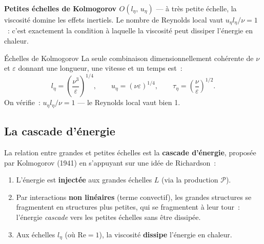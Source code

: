 \documentclass[11pt,a4paper]{report}
\begin{document}
\medskip
\noindent\textbf{Petites \'echelles de Kolmogorov $O(l_\eta,\,u_\eta)$} --- \`a tr\`es petite
\'echelle, la viscosit\'e domine les effets inertiels. Le nombre de Reynolds local vaut
$u_\eta l_\eta/\nu = 1$~: c'est exactement la condition \`a laquelle la viscosit\'e peut
dissiper l'\'energie en chaleur.

\begin{defbox}{\'Echelles de Kolmogorov}
La seule combinaison dimensionnellement coh\'erente de $\nu$ et $\varepsilon$ donnant une
longueur, une vitesse et un temps est~:
\[
  l_\eta = \left(\frac{\nu^3}{\varepsilon}\right)^{1/4}, \qquad
  u_\eta = (\nu\varepsilon)^{1/4}, \qquad
  \tau_\eta = \left(\frac{\nu}{\varepsilon}\right)^{1/2}.
\]
On v\'erifie~: $u_\eta l_\eta/\nu = 1$ --- le Reynolds local vaut bien 1.
\end{defbox}

\subsection{La cascade d'\'energie}

La relation entre grandes et petites \'echelles est la \textbf{cascade d'\'energie}, propos\'ee
par Kolmogorov (1941) en s'appuyant sur une id\'ee de Richardson~:

\begin{enumerate}
  \item L'\'energie est \textbf{inject\'ee} aux grandes \'echelles $L$ (via la production $\mathcal{P}$).
  \item Par interactions \textbf{non lin\'eaires} (terme convectif), les grandes structures
        se fragmentent en structures plus petites, qui se fragmentent \`a leur tour~: l'\'energie
        \emph{cascade} vers les petites \'echelles sans \^etre dissip\'ee.
  \item Aux \'echelles $l_\eta$ (o\`u $\mathrm{Re}=1$), la viscosit\'e \textbf{dissipe}
        l'\'energie en chaleur.
\end{enumerate}

\begin{center}
\end{center}
\end{document}
